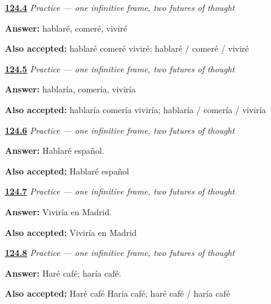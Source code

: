 \noindent\begin{minipage}[t]{\linewidth}
\raggedright
\hyperlink{review-ES-C17-practice-regular-future-yo}{\textbf{124.4}} \emph{Practice — one infinitive frame, two futures of thought}\par
\small \textbf{Answer:} hablaré, comeré, viviré\par
\footnotesize \textbf{Also accepted:} hablaré comeré viviré; hablaré / comeré / viviré
\end{minipage}\par\medskip

\noindent\begin{minipage}[t]{\linewidth}
\raggedright
\hyperlink{review-ES-C17-practice-regular-conditional-yo}{\textbf{124.5}} \emph{Practice — one infinitive frame, two futures of thought}\par
\small \textbf{Answer:} hablaría, comería, viviría\par
\footnotesize \textbf{Also accepted:} hablaría comería viviría; hablaría / comería / viviría
\end{minipage}\par\medskip

\noindent\begin{minipage}[t]{\linewidth}
\raggedright
\hyperlink{review-ES-C17-practice-hablare-espanol}{\textbf{124.6}} \emph{Practice — one infinitive frame, two futures of thought}\par
\small \textbf{Answer:} Hablaré español.\par
\footnotesize \textbf{Also accepted:} Hablaré español
\end{minipage}\par\medskip

\noindent\begin{minipage}[t]{\linewidth}
\raggedright
\hyperlink{review-ES-C17-practice-viviria-madrid}{\textbf{124.7}} \emph{Practice — one infinitive frame, two futures of thought}\par
\small \textbf{Answer:} Viviría en Madrid.\par
\footnotesize \textbf{Also accepted:} Viviría en Madrid
\end{minipage}\par\medskip

\noindent\begin{minipage}[t]{\linewidth}
\raggedright
\hyperlink{review-ES-C17-practice-hacer-pair}{\textbf{124.8}} \emph{Practice — one infinitive frame, two futures of thought}\par
\small \textbf{Answer:} Haré café; haría café.\par
\footnotesize \textbf{Also accepted:} Haré café Haría café; haré café / haría café
\end{minipage}\par\medskip

